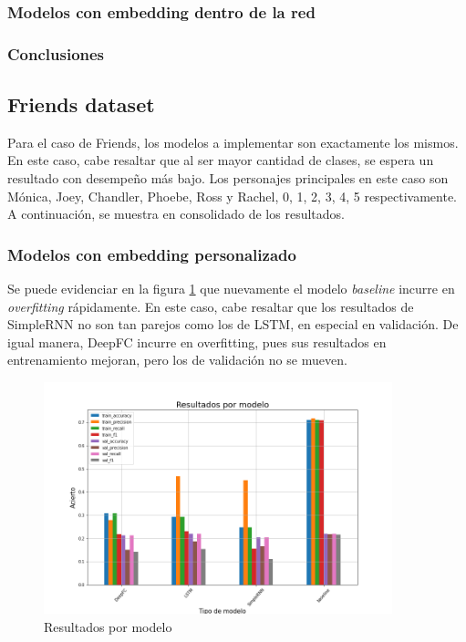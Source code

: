 \subsubsection{Modelos con embedding dentro de la red}

\subsubsection{Conclusiones}

\subsection{Friends dataset}

Para el caso de Friends, los modelos a implementar son exactamente los mismos. En este caso, cabe resaltar que al ser mayor cantidad de clases, se espera un resultado con desempeño más bajo. Los personajes principales en este caso son Mónica, Joey, Chandler, Phoebe, Ross y Rachel, 0, 1, 2, 3, 4, 5 respectivamente. A continuación, se muestra en consolidado de los resultados.\\

\subsubsection{Modelos con embedding personalizado}

Se puede evidenciar en la figura \ref{fig:fri_deep_model} que nuevamente el modelo \textit{baseline} incurre en \textit{overfitting} rápidamente. En este caso, cabe resaltar que los resultados de SimpleRNN no son tan parejos como los de LSTM, en especial en validación. De igual manera, DeepFC incurre en overfitting, pues sus resultados en entrenamiento mejoran, pero los de validación no se mueven.\\

\begin{figure}
    \centering
    \includegraphics[width=0.9\textwidth]{results/friends/deepModels/sim_res_deep_model.png}
    \caption{Resultados por modelo}
    \label{fig:fri_deep_model}
\end{figure}

